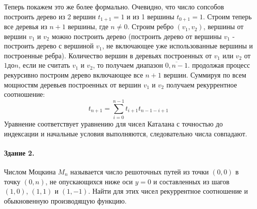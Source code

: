 \documentclass[a4paper,12pt]{article}
\begin{document}
\begin{Solution}
Теперь покажем это же более формально. Очевидно, что число сопсобов построить дерево из 2 вершин $t_{1+1} = 1$ и из 1 вершины $t_{0+1} = 1$. Строим теперь все деревья из $n+1$ вершины, где $n \not= 0$. Строим ребро $(v_1, v_2)$, вершины от вершин $v_1$ и $v_2$ можно построить дерево (построить дерево от вершины $v_1$ - построить дерево с вершиной $v_1$, не включающее уже использованные вершины и построенные ребра). Количество вершин в деревьях построенных от $v_1$ или $v_2$ от $1 до n$, если не считать $v_1$ и $v_2$, то получаем диапазон $\overline{0, n-1}$. продолжая процесс рекурсивно построим дерево включающее все $n+1$ вершин.  Суммируя по всем мощностям деревьев построенных от вершин $v_1$ и $v_2$ получаем рекуррентное соотношение:
\[
	t_{n+1} = \sum_{i=0}^{n-1} t_{i+1} t_{n-1-i+1}
\]
Уравнение соответствует уравнению для чисел Каталана с точностью до индексации и начальные условия выполняются, следовательно числа совпадают.

\end{Solution}


\paragraph{Здание 2.} Числом Моцкина $M_n$ называется число решоточных путей из точки $(0,0)$ в точку $(0,n)$, не опускающихся ниже оси $y=0$ и составленных из шагов $(1,0)$, $(1,1)$ и $(1,-1)$. Найти для этих чисел рекуррентное соотношение и обыкновенную производящую функцию.
\end{document}
